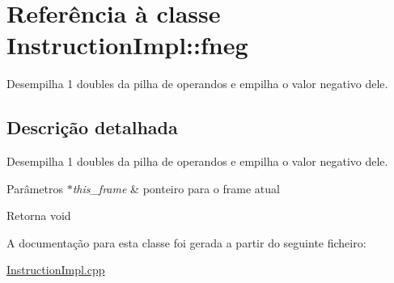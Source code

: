 \hypertarget{class_instruction_impl_1_1fneg}{}\section{Referência à classe Instruction\+Impl\+:\+:fneg}
\label{class_instruction_impl_1_1fneg}


Desempilha 1 doubles da pilha de operandos e empilha o valor negativo dele.  




\subsection{Descrição detalhada}
Desempilha 1 doubles da pilha de operandos e empilha o valor negativo dele. 


\begin{DoxyParams}{Parâmetros}
{\em $\ast$this\+\_\+frame} & ponteiro para o frame atual \\
\hline
\end{DoxyParams}
\begin{DoxyReturn}{Retorna}
void 
\end{DoxyReturn}


A documentação para esta classe foi gerada a partir do seguinte ficheiro\+:\begin{DoxyCompactItemize}
\item 
\hyperlink{_instruction_impl_8cpp}{Instruction\+Impl.\+cpp}\end{DoxyCompactItemize}
